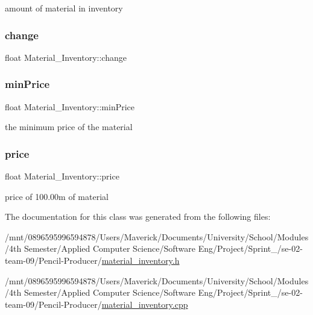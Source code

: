 amount of material in inventory 

\mbox{\label{classMaterial__Inventory_a3fbae5816d7f24c3715f8c7d2cc842a6}} 
\subsubsection{\texorpdfstring{change}{change}}
{\footnotesize\ttfamily float Material\+\_\+\+Inventory\+::change\hspace{0.3cm}{\ttfamily [private]}}

\mbox{\label{classMaterial__Inventory_afb28e18e6100fb9ef18c283866759bb3}} 
\subsubsection{\texorpdfstring{min\+Price}{minPrice}}
{\footnotesize\ttfamily float Material\+\_\+\+Inventory\+::min\+Price\hspace{0.3cm}{\ttfamily [private]}}



the minimum price of the material 

\mbox{\label{classMaterial__Inventory_a32622250fa5246e1ee091d3fd8dd72ff}} 
\subsubsection{\texorpdfstring{price}{price}}
{\footnotesize\ttfamily float Material\+\_\+\+Inventory\+::price\hspace{0.3cm}{\ttfamily [private]}}



price of 100.\+00m of material 



The documentation for this class was generated from the following files\+:\begin{DoxyCompactItemize}
\item 
/mnt/0896595996594878/\+Users/\+Maverick/\+Documents/\+University/\+School/\+Modules/4th Semester/\+Applied Computer Science/\+Software Eng/\+Project/\+Sprint\+\_/se-\/02-\/team-\/09/\+Pencil-\/\+Producer/\hyperlink{material__inventory_8h}{material\+\_\+inventory.\+h}\item 
/mnt/0896595996594878/\+Users/\+Maverick/\+Documents/\+University/\+School/\+Modules/4th Semester/\+Applied Computer Science/\+Software Eng/\+Project/\+Sprint\+\_/se-\/02-\/team-\/09/\+Pencil-\/\+Producer/\hyperlink{material__inventory_8cpp}{material\+\_\+inventory.\+cpp}\end{DoxyCompactItemize}
